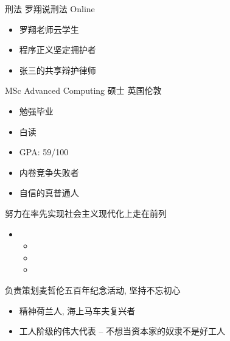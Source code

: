 

刑法 \quad 罗翔说刑法 \hfill Online

\begin{itemize}
  \item 罗翔老师云学生
  \item 程序正义坚定拥护者
  \item 张三的共享辩护律师
\end{itemize}


MSc Advanced Computing \quad 硕士 \hfill {英国伦敦}
\begin{itemize}
  \item 勉强毕业
  \item 白读
\end{itemize}




\begin{itemize}
  \item GPA: 59/100
  \item 内卷竞争失败者
  \item 自信的真普通人
\end{itemize}



努力在率先实现社会主义现代化上走在前列

\begin{itemize}
  \item
  \begin{itemize}
      \item
      \item
      \item
  \end{itemize}

\end{itemize}



负责策划麦哲伦五百年纪念活动, 坚持不忘初心
\begin{itemize}
  \item 精神荷兰人, 海上马车夫复兴者
  \item 工人阶级的伟大代表 -- 不想当资本家的奴隶不是好工人
\end{itemize}

